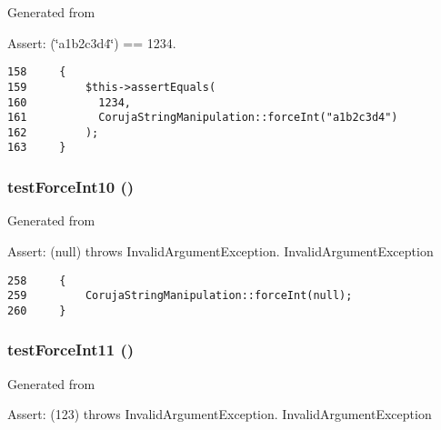Generated from \begin{Desc}
\item[Assert:](\char`\"{}a1b2c3d4\char`\"{}) == 1234. \end{Desc}


\begin{Code}\begin{verbatim}158     {
159         $this->assertEquals(
160           1234,
161           CorujaStringManipulation::forceInt("a1b2c3d4")
162         );
163     }
\end{verbatim}
\end{Code}


\hypertarget{class_coruja_string_manipulation_test_a5046ef7ceda55e25c509426591ec617}{
\subsubsection[{testForceInt10}]{\setlength{\rightskip}{0pt plus 5cm}testForceInt10 ()}}
\label{class_coruja_string_manipulation_test_a5046ef7ceda55e25c509426591ec617}


Generated from \begin{Desc}
\item[Assert:](null) throws InvalidArgumentException.  InvalidArgumentException \end{Desc}


\begin{Code}\begin{verbatim}258     {
259         CorujaStringManipulation::forceInt(null);
260     }
\end{verbatim}
\end{Code}


\hypertarget{class_coruja_string_manipulation_test_443aee77ee9e70479a8b3ca19c7b0fd7}{
\subsubsection[{testForceInt11}]{\setlength{\rightskip}{0pt plus 5cm}testForceInt11 ()}}
\label{class_coruja_string_manipulation_test_443aee77ee9e70479a8b3ca19c7b0fd7}


Generated from \begin{Desc}
\item[Assert:](123) throws InvalidArgumentException.  InvalidArgumentException \end{Desc}


